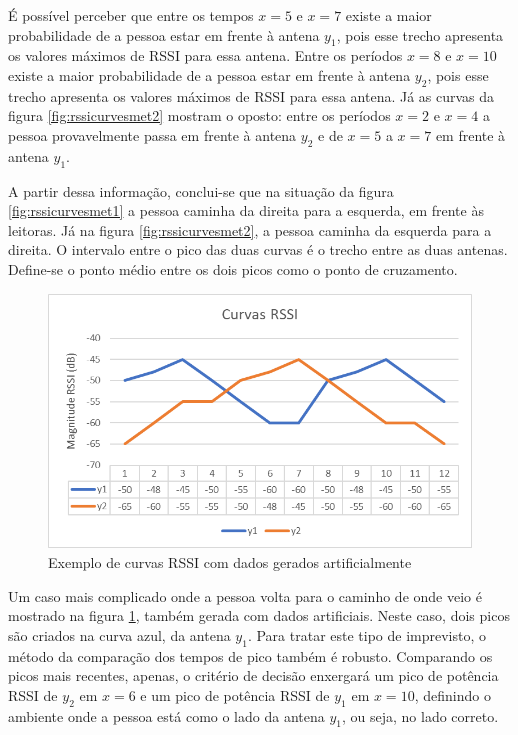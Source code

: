  É possível perceber que entre os tempos $x=5$ e $x=7$ existe a maior probabilidade de a pessoa estar em frente à antena $y_1$, pois esse trecho apresenta os valores máximos de RSSI para essa antena. Entre os períodos $x=8$ e $x=10$ existe a maior probabilidade de a pessoa estar em frente à antena $y_2$, pois esse trecho apresenta os valores máximos de RSSI para essa antena. Já as curvas da figura \ref{fig:rssicurvesmet2} mostram o oposto: entre os períodos $x=2$ e $x=4$ a pessoa provavelmente passa em frente à antena $y_2$ e de $x=5$ a $x=7$ em frente à antena $y_1$.
 
 A partir dessa informação, conclui-se que na situação da figura \ref{fig:rssicurvesmet1} a pessoa caminha da direita para a esquerda, em frente às leitoras. Já na figura \ref{fig:rssicurvesmet2}, a pessoa caminha da esquerda para a direita. O intervalo entre o pico das duas curvas é o trecho entre as duas antenas. Define-se o ponto médio entre os dois picos como o ponto de cruzamento.
 
  \begin{figure}[h]
    \centering
    \includegraphics[width=0.8\linewidth]{figs/Metodologia/curvas1.png}
    \caption{Exemplo de curvas RSSI com dados gerados artificialmente}
    \label{fig:rssicurvesmet3}
\end{figure}

Um caso mais complicado onde a pessoa volta para o caminho de onde veio é mostrado na figura \ref{fig:rssicurvesmet3}, também gerada com dados artificiais. Neste caso, dois picos são criados na curva azul, da antena $y_1$. Para tratar este tipo de imprevisto, o método da comparação dos tempos de pico também é robusto. Comparando os picos mais recentes, apenas, o critério de decisão enxergará um pico de potência RSSI de $y_2$ em $x=6$ e um pico de potência RSSI de $y_1$ em $x=10$, definindo o ambiente onde a pessoa está como o lado da antena $y_1$, ou seja, no lado correto.
 
